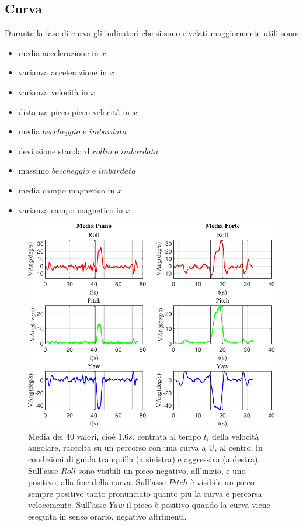 \documentclass[class=article]{standalone}
\begin{document}
	\newpage
	\subsection{Curva}
	Durante la fase di curva gli indicatori che si sono rivelati maggiormente utili sono:
	\begin{itemize}
		\item media accelerazione in \(x\)
		\item varianza accelerazione in \(x\)
		\item varianza velocità in \(x\)
		\item distanza picco-picco velocità in \(x\)
		\item media \(beccheggio\) e \(imbardata\)
		\item deviazione standard \(rollio\) e \(imbardata\)
		\item massimo \(beccheggio\) e \(imbardata\)
		\item media campo magnetico in \(x\)
		\item varianza campo magnetico in \(x\)

	\end{itemize}
	
	\begin{center}
		\begin{figure}[h!]
			\centering\includegraphics[width=.7\textwidth]{img/CurvaUFP/VAng/Media}
			\caption[]{Media dei 40 valori, cioè \(1.6s\), centrata al tempo \(t_{i}\) della velocità angolare, raccolta su un percorso con una curva a U, al centro, in condizioni di guida tranquilla (a sinistra) e aggressiva (a destra). Sull'asse \(Roll\) sono visibili un picco negativo, all'inizio, e uno positivo, alla fine della curva. Sull'asse \(Pitch\) è visibile un picco sempre positivo tanto pronunciato quanto più la curva è percorsa velocemente. Sull'asse \(Yaw\) il picco è positivo quando la curva viene eseguita in senso orario, negativo altrimenti.}
			\label{fig:VAngMedia_CurvaUFP}
		\end{figure}
	\end{center}
	
\end{document}
